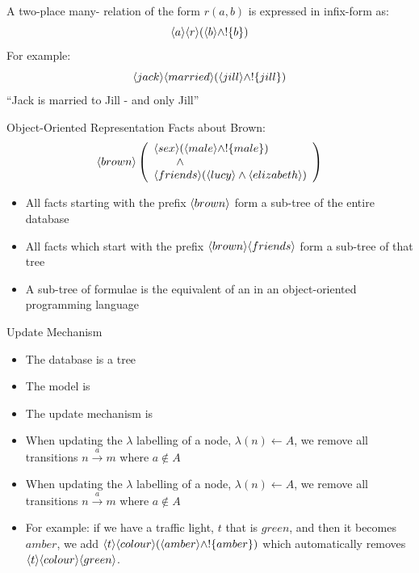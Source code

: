 \begin{frame}
A two-place many- relation of the form $r(a, b)$ is expressed in infix-form as:
\[
\langle a \rangle \langle r \rangle (\langle b \rangle \land ! \{b\})
\]
For example:
\[
\langle jack \rangle \langle married \rangle (\langle jill \rangle \land ! \{jill\})
\]
``Jack is married to Jill - and only Jill''
\end{frame}

\begin{frame}{Object-Oriented Representation}
Facts about Brown:
\[
   \langle brown \rangle \left(
   \begin{array}{l}
     \langle sex \rangle (\langle male \rangle \land ! \{male\}) \\
        \qquad \land \\
     \langle friends \rangle (\langle lucy \rangle \land \langle elizabeth \rangle ) 
   \end{array}
   \right)
\]
\begin{itemize}
\item
All facts  starting with the prefix $\MAY{brown}$ form a
sub-tree of the entire database
\item
All  facts which start with
the prefix $\MAY{brown} \MAY{friends}$ form a sub-tree of that tree
\item
A sub-tree of formulae is the \cathoristic{} equivalent of an
 in an object-oriented programming language
\end{itemize}
\end{frame}

\begin{frame}{Update Mechanism}
\begin{itemize}
\item
The database is a tree
\item
The model is 
\item
The update mechanism is 
\item
When updating the $\lambda$ labelling of a node, $\lambda(n) \leftarrow A$, we remove all transitions $n \xrightarrow{a} m$ where $a \notin A$
\end{itemize}
\end{frame}

\begin{frame}
\begin{itemize}
\item
When updating the $\lambda$ labelling of a node, $\lambda(n) \leftarrow A$, we remove all transitions $n \xrightarrow{a} m$ where $a \notin A$
\item
For example: if we have a traffic light, $t$ that is $green$, and then it becomes $amber$, we add $\langle t \rangle \langle colour \rangle (\langle amber \rangle \land ! \{amber\})$ which automatically removes $\MAY{t}\MAY{colour}\MAY{green}$.
\end{itemize}
\end{frame}

